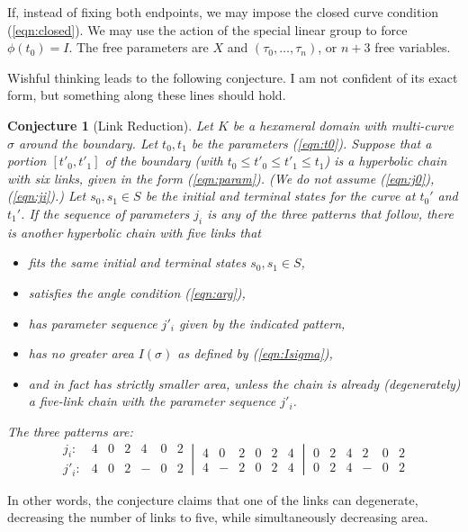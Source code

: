 \documentclass[11pt]{amsart}
\newtheorem{conj}{Conjecture}
\def\ta{{\tau}}
\begin{document}
If, instead of fixing both endpoints, we may impose the closed
curve condition (\ref{eqn:closed}). We may use the action of
the special linear group to force $\phi(t_0)=I$.  The free
parameters are $X$ and $(\ta_0,\ldots,\ta_n)$, or $n+3$ free
variables.  


Wishful thinking leads to the following conjecture.  I am not confident
of its exact form, but something along these lines should hold.

\begin{conj}[Link Reduction] \label{conj:defrag}
Let $K$ be a hexameral domain with multi-curve $\sigma$ around the
boundary. 
Let $t_0,t_1$ be the parameters (\ref{eqn:t0}).  Suppose
that a portion $[t'_0,t'_1]$ of the boundary (with $t_0\le t'_0\le t'_1\le t_1$) is a hyperbolic chain with six
links, given in the form (\ref{eqn:param}).  (We do not assume (\ref{eqn:j0}), (\ref{eqn:ji}).)  Let $s_0,s_1\in S$ be the initial and terminal states
for the curve at $t_0'$ and $t_1'$.
If the sequence of parameters $j_i$ is any of the three patterns
that follow, there is another hyperbolic chain with five links
that 
\begin{itemize}
\item fits the same initial and terminal states $s_0,s_1\in S$,
\item satisfies the angle condition (\ref{eqn:arg}),
\item has parameter sequence $j'_i$ given by the indicated pattern,
\item has no greater area $I(\sigma)$ as defined by (\ref{eqn:Isigma}),
\item and in fact has strictly smaller area, unless the chain is already (degenerately) a 
five-link chain with the parameter sequence $j'_i$.
\end{itemize}
The three patterns are:
$$
\begin{array}{llllllllllllllllll}
j_i: &4&0&2&4&0&2\\
j'_i: &4&0&2&-&0&2
\end{array}
~\left|~
\begin{array}{llllllllllllllllll}
4&0&2&0&2&4\\
4&-&2&0&2&4
\end{array}
~\right|~
\begin{array}{llllllllllllllllll}
0&2&4&2&0&2 \\
0&2&4&-&0&2
\end{array}
$$
\end{conj}

In other words, the conjecture claims that one of the links can degenerate, decreasing the number of links to five, while simultaneously
decreasing area.
\end{document}

